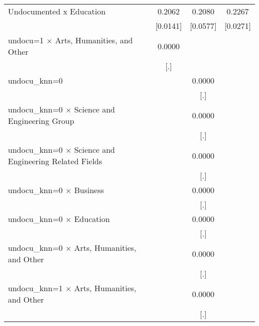 \begin{table}[htbp]
\begin{tabular}{l*{3}{c}}
\addlinespace
Undocumented x Education&      0.2062\sym{***}&      0.2080\sym{***}&      0.2267\sym{***}\\
                    &    [0.0141]         &    [0.0577]         &    [0.0271]         \\
\addlinespace
undocu=1 $\times$ Arts, Humanities, and Other&      0.0000         &                     &                     \\
                    &         [.]         &                     &                     \\
\addlinespace
undocu\_knn=0        &                     &      0.0000         &                     \\
                    &                     &         [.]         &                     \\
\addlinespace
undocu\_knn=0 $\times$ Science and Engineering Group&                     &      0.0000         &                     \\
                    &                     &         [.]         &                     \\
\addlinespace
undocu\_knn=0 $\times$ Science and Engineering Related Fields&                     &      0.0000         &                     \\
                    &                     &         [.]         &                     \\
\addlinespace
undocu\_knn=0 $\times$ Business&                     &      0.0000         &                     \\
                    &                     &         [.]         &                     \\
\addlinespace
undocu\_knn=0 $\times$ Education&                     &      0.0000         &                     \\
                    &                     &         [.]         &                     \\
\addlinespace
undocu\_knn=0 $\times$ Arts, Humanities, and Other&                     &      0.0000         &                     \\
                    &                     &         [.]         &                     \\
\addlinespace
undocu\_knn=1 $\times$ Arts, Humanities, and Other&                     &      0.0000         &                     \\
                    &                     &         [.]         &                     \\

\end{tabular}
\end{table}
